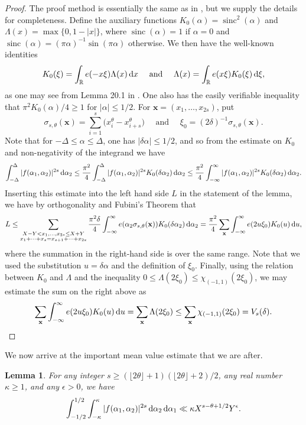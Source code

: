 \documentclass[11pt,reqno]{amsart}
\numberwithin{equation}{section}
\newtheorem{lemma}{Lemma}[section]
\renewcommand{\d}{\,{\rm d}}
\begin{document}
\begin{proof} The proof method is essentially the same as in \cite{Poulias1}, but we supply the details for completeness. Define the auxiliary functions $K_0(\alpha) = \operatorname{sinc}^2(\alpha) $ and $\Lambda(x) = \max\{ 0, 1-|x|\}$, where $\operatorname{sinc}(\alpha) = 1 $ if $\alpha =0$ and $\operatorname{sinc}(\alpha) = (\pi\alpha)^{-1}\sin(\pi\alpha)$
otherwise. We then have the well-known identities
\[ K_0(\xi) = \int_{\mathbb{R}} e(-x\xi)\Lambda(x)\d x \quad \text{ and } \quad \Lambda(x) = \int_{\mathbb{R}} e(x\xi)K_0(\xi)\d\xi, \]
as one may see from Lemma 20.1 in \cite{DavBook}. One also has the easily verifiable inequality that $\pi^2K_0(\alpha)/4 \geq 1$ for $|\alpha|\leq 1/2$. For $\mathbf{x} = (x_1,\ldots,x_{2s})$, put 
\[ \sigma_{s,\theta}(\mathbf{x}) = \sum_{i=1}^s \big(x_i^{\theta}-x_{i+s}^{\theta}\big) \quad \text{ and } \quad \xi_0 = (2\delta)^{-1} \sigma_{s,\theta}(\mathbf{x}). \]
Note that for $-\Delta \leq \alpha \leq \Delta$, one has $|\delta\alpha|\leq 1/2$, and so from the estimate on $K_0$ and non-negativity of the integrand we have 
\[ \int_{-\Delta}^{\Delta} |f(\alpha_1,\alpha_2)|^{2s}\d\alpha_2 \leq \frac{\pi^2}{4}\int_{-\Delta}^{\Delta} |f(\alpha_1,\alpha_2)|^{2s}K_0(\delta\alpha_2)\d\alpha_2 \leq \frac{\pi^2}{4}\int_{-\infty}^{\infty}|f(\alpha_1,\alpha_2)|^{2s}K_0(\delta\alpha_2)\d\alpha_2. \]
Inserting this estimate into the left hand side $L$ in the statement of the lemma, we have by orthogonality and Fubini's Theorem that 
\[ L \leq \sum_{\substack{X-Y < x_1,\ldots,x_{2s} \leq X+Y \\ x_1+\cdots +x_s = x_{s+1}+\cdots +x_{2s}}} \frac{\pi^2\delta}{4} \int_{-\infty}^{\infty} e(\alpha_2 \sigma_{s,\theta}(\mathbf{x}))K_0(\delta\alpha_2)\d\alpha_2 = \frac{\pi^2}{4}\sum_{\mathbf{x}} \int_{-\infty}^{\infty} e(2u\xi_0)K_0(u)\d u, \]
where the summation in the right-hand side is over the same range. Note that we used the substitution $u = \delta\alpha$ and the definition of $\xi_0$. Finally, using the relation between $K_0$ and $\Lambda$ and the inequality $0 \leq \Lambda(2\xi_0) \leq \chi_{(-1,1)}(2\xi_0)$, we may estimate the sum on the right above as 
\[ \sum_{\mathbf{x}} \int_{-\infty}^{\infty} e(2u\xi_0)K_0(u)\d u = \sum_{\mathbf{x}} \Lambda(2\xi_0) \leq \sum_{\mathbf{x}} \chi_{(-1,1)}(2\xi_0) = V_s(\delta). \]
\end{proof}

We now arrive at the important mean value estimate that we are after. 

\begin{lemma} \label{lem:mean}
For any integer $s \geq (\lfloor 2\theta \rfloor + 1)(\lfloor 2\theta \rfloor + 2)/2$, any real number $\kappa \geq 1$, and any $\epsilon > 0$, we have 
\[ \int_{-1/2}^{1/2} \int_{-\kappa}^{\kappa} |f(\alpha_1,\alpha_2)|^{2s} \d\alpha_2 \d\alpha_1 \ll \kappa X^{s-\theta+1/2}Y^{\epsilon}.  \]
\end{lemma}
\end{document}
